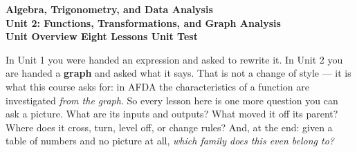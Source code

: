 %

\vspace{-0.8in}

\begin{center}
  {\color{white}\textbf{\LARGE Algebra, Trigonometry, and Data Analysis}}\\[4pt]
  {\color{mistmid}\large\textbf{Unit 2: Functions, Transformations, and Graph Analysis}}\\[6pt]
  {\color{white}\textbf{\large Unit Overview \quad\textbar\quad Eight Lessons \quad\textbar\quad Unit Test}}
\end{center}

\vspace{0.20in}
\namedateperiod
\vspace{0.14in}

\noindent
\small
In Unit 1 you were handed an expression and asked to rewrite it. In Unit 2 you are handed a
\textbf{graph} and asked what it says. That is not a change of style --- it is what this course
asks for: in AFDA the characteristics of a function are investigated \emph{from the graph}. So
every lesson here is one more question you can ask a picture. What are its inputs and outputs?
What moved it off its parent? Where does it cross, turn, level off, or change rules? And, at the
end: given a table of numbers and no picture at all, \emph{which family does this even belong to?}

\vspace{0.12in}

